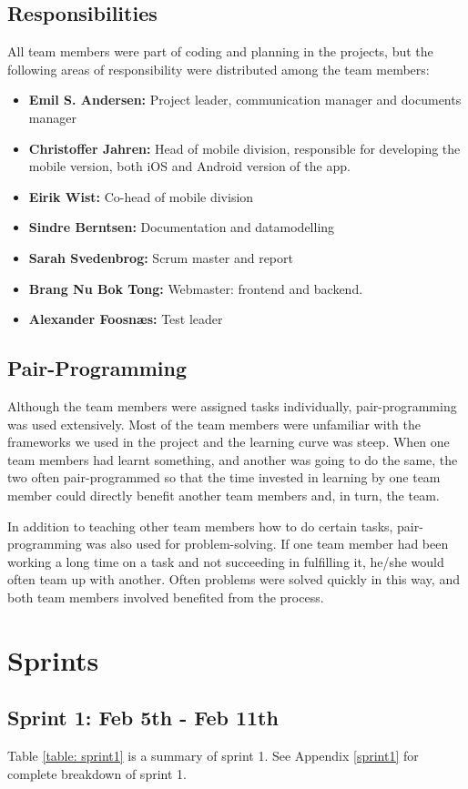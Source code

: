 \subsection{Responsibilities}
All team members were part of coding and planning in the projects, but the following areas of responsibility were distributed among the team members:
\begin{itemize}
    \item[] \textbf{Emil S. Andersen:} Project leader, communication manager and documents manager
    \item[] \textbf{Christoffer Jahren:} Head of mobile division, responsible for developing the mobile version, both iOS and Android version of the app.
    \item[] \textbf{Eirik Wist:} Co-head of mobile division 
    \item[] \textbf{Sindre Berntsen:} Documentation and datamodelling 
    \item[] \textbf{Sarah Svedenbrog:} Scrum master and report
    \item[] \textbf{Brang Nu Bok Tong:} Webmaster: frontend and backend.
    \item[] \textbf{Alexander Foosnæs:} Test leader 
\end{itemize}
\subsection{Pair-Programming}
Although the team members were assigned tasks individually, pair-programming was used extensively. Most of the team members were unfamiliar with the frameworks we used in the project and the learning curve was steep. When one team members had learnt something, and another was going to do the same, the two often pair-programmed so that the time invested in learning by one team member could directly benefit another team members and, in turn, the team.

In addition to teaching other team members how to do certain tasks, pair-programming was also used for problem-solving. If one team member had been working a long time on a task and not succeeding in fulfilling it, he/she would often team up with another. Often problems were solved quickly in this way, and both team members involved benefited from the process.

\section{Sprints}
\subsection*{Sprint 1: Feb 5th - Feb 11th}
Table \ref{table: sprint1} is a summary of sprint 1. See Appendix \ref{sprint1} for complete breakdown of sprint 1. 

